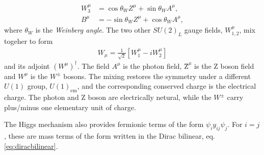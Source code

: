 \documentclass[twoside,english]{uiofysmaster}
\begin{document}
\begin{align}
	W_3^\mu &= \cos\theta_W Z^\mu + \sin\theta_W A^\mu,\\
	B^\mu &= -\sin\theta_W Z^\mu + \cos\theta_W A^\mu,
\end{align}
where $\theta_W$ is the {\it Weinberg angle}. The two other $SU(2)_L$ gauge fields, $W_{1,2}^\mu$, mix togeher to form
\begin{align}
	W_\mu = \frac{1}{\sqrt{2}} \left[ W_1^\mu - iW_2^\mu \right]
\end{align}
and its adjoint $(W^\mu)^\dag$. The field $A^\mu$ is the photon field, $Ẑ^\mu$ is the Z boson field and $W^\mu$ is the $W^\pm$ bosons. The mixing restores the symmetry under a different $U(1)$ group, $U(1)_\mathrm{em}$, and the corresponding conserved charge is the electrical charge. The photon and Z boson are electrically netural, while the $W^\pm$ carry plus/minus one elementary unit of charge.

The Higgs mechanism also provides fermionic terms of the form $\psi_i y_{ij} \psi_j$. For $i=j$, these are mass terms of the form written in the Dirac bilinear, eq. \eqref{eq:diracbilinear}.
\end{document}
